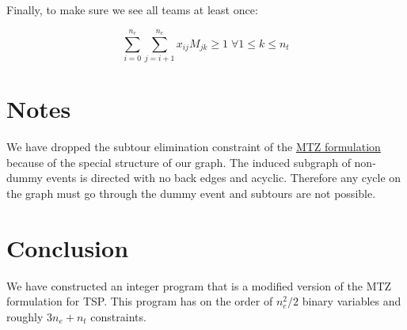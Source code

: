 \documentclass[11pt]{article}
\begin{document}
Finally, to make sure we see all teams at least once:

\begin{equation} \label{constr:teams}
    \sum_{i=0}^{n_e} \sum_{j=i + 1}^{n_e} x_{ij}M_{jk} \geq 1 \; \forall 1 \leq k \leq n_t
\end{equation}

\section{Notes}
We have dropped the subtour elimination constraint of the \href{https://en.wikipedia.org/wiki/Travelling_salesman_problem#Miller%E2%80%93Tucker%E2%80%93Zemlin_formulation}{MTZ formulation} because of the special structure of our graph. The induced subgraph of non-dummy events is directed with no back edges and acyclic. Therefore any cycle on the graph must go through the dummy event and subtours are not possible.

\section{Conclusion}
We have constructed an integer program that is a modified version of the MTZ formulation for TSP. This program has on the order of $n_e^2 / 2$ binary variables and roughly $3n_e + n_t$ constraints.
\end{document}
